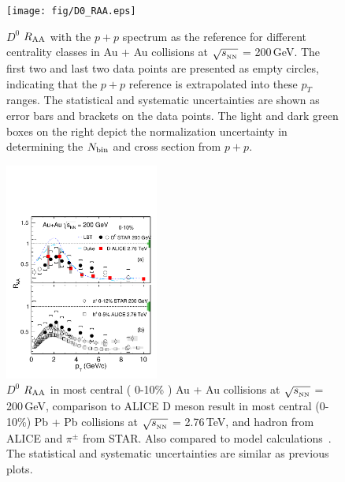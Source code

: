 \documentclass[%
 reprint,	
 amsmath,amssymb,
 aps,
 prc,
]{revtex4-1}
\begin{document}

\begin{figure}
\centering
\texttt{[image: fig/D0\_RAA.eps]}
\caption{$D^{0}$ $R_{\rm AA}$ with the $p+p$ spectrum as the reference for different centrality classes in Au + Au collisions at $\sqrt{s_{_{\rm NN}}}$ = 200\,GeV. The first two and last two data points are presented as empty circles, indicating that the $p+p$ reference is extrapolated into these $p_T$ ranges. The statistical and systematic uncertainties are shown as error bars and brackets on the data points. The light and dark green boxes on the right depict the normalization uncertainty in determining the $N_{\rm bin}$ and cross section from $p+p$.}
\label{fig:D0_RAA} 
\end{figure}

\begin{figure}
\centering
\includegraphics[width=0.45\textwidth]{fig/D0_RAA_LHC.pdf}
\caption{$D^{0}$ $R_{\rm AA}$ in most central ( 0-10\% ) Au + Au collisions at $\sqrt{s_{_{\rm NN}}}$ = 200\,GeV, comparison to ALICE D meson result in most central (0-10\%) Pb + Pb collisions at $\sqrt{s_{_{\rm NN}}}$ = 2.76\,TeV, and hadron from ALICE and $\pi^{\pm}$ from STAR. Also compared to model calculations~\cite{Cao:2016gvr,LBT:private}. The statistical and systematic uncertainties are similar as previous plots.}
\label{fig:D0_RAA_LHC} 
\end{figure}
\end{document}
